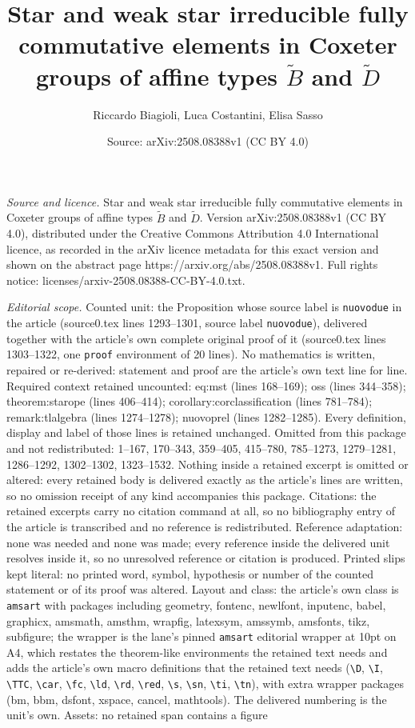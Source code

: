 \documentclass[10pt,a4paper]{amsart}
\title[Star and weak star irreducible fully commutative elements in]{Star and weak star irreducible fully commutative elements in Coxeter groups of affine types $\widetilde{B}$ and $\widetilde{D}$}
\author{Riccardo Biagioli, Luca Costantini, Elisa Sasso}
\date{Source: arXiv:2508.08388v1 (CC BY 4.0)}
\begin{document}
\maketitle

\noindent\emph{Source and licence.} Star and weak star irreducible fully commutative elements in Coxeter groups of affine types $\widetilde{B}$ and $\widetilde{D}$. Version arXiv:2508.08388v1 (CC BY 4.0), distributed under the Creative Commons Attribution 4.0 International licence, as recorded in the arXiv licence metadata for this exact version and shown on the abstract page https://arxiv.org/abs/2508.08388v1. Full rights notice: licenses/arxiv-2508.08388-CC-BY-4.0.txt.\par\smallskip

\noindent\textit{Editorial scope.} Counted unit: the Proposition whose source label is \texttt{nuovodue} in the article (source0.tex lines 1293--1301, source label \texttt{nuovodue}), delivered together with the article's own complete original proof of it (source0.tex lines 1303--1322, one \texttt{proof} environment of 20 lines). No mathematics is written, repaired or re-derived: statement and proof are the article's own text line for line. Required context retained uncounted: eq:mst (lines 168--169); oss (lines 344--358); theorem:starope (lines 406--414); corollary:corclassification (lines 781--784); remark:tlalgebra (lines 1274--1278); nuovoprel (lines 1282--1285). Every definition, display and label of those lines is retained unchanged. Omitted from this package and not redistributed: 1--167, 170--343, 359--405, 415--780, 785--1273, 1279--1281, 1286--1292, 1302--1302, 1323--1532. Nothing inside a retained excerpt is omitted or altered: every retained body is delivered exactly as the article's lines are written, so no omission receipt of any kind accompanies this package. Citations: the retained excerpts carry no citation command at all, so no bibliography entry of the article is transcribed and no reference is redistributed. Reference adaptation: none was needed and none was made; every reference inside the delivered unit resolves inside it, so no unresolved reference or citation is produced. Printed slips kept literal: no printed word, symbol, hypothesis or number of the counted statement or of its proof was altered. Layout and class: the article's own class is \texttt{amsart} with packages including geometry, fontenc, newlfont, inputenc, babel, graphicx, amsmath, amsthm, wrapfig, latexsym, amssymb, amsfonts, tikz, subfigure; the wrapper is the lane's pinned \texttt{amsart} editorial wrapper at 10pt on A4, which restates the theorem-like environments the retained text needs and adds the article's own macro definitions that the retained text needs (\texttt{\textbackslash D}, \texttt{\textbackslash I}, \texttt{\textbackslash TTC}, \texttt{\textbackslash car}, \texttt{\textbackslash fc}, \texttt{\textbackslash ld}, \texttt{\textbackslash rd}, \texttt{\textbackslash red}, \texttt{\textbackslash s}, \texttt{\textbackslash sn}, \texttt{\textbackslash ti}, \texttt{\textbackslash tn}), with extra wrapper packages (bm, bbm, dsfont, xspace, cancel, mathtools). The delivered numbering is the unit's own. Assets: no retained span contains a figure 
\end{document}
